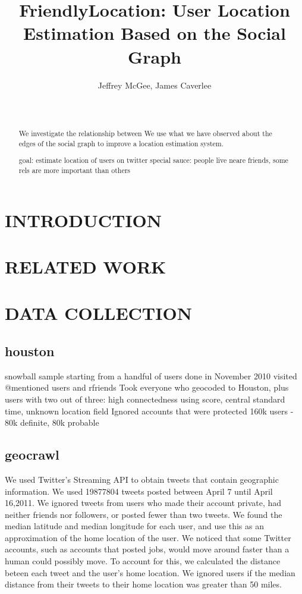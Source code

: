 \documentclass{sig-alternate}
\title{FriendlyLocation: User Location Estimation Based on the Social Graph}
\author{
    \alignauthor Jeffrey McGee, James Caverlee\\
    \affaddr{Department of Computer Science and Engineering, Texas A\&M
    University} \\
    \affaddr{ College Station, TX 77845 USA} \\
    \email{jeffamcgee@tamu.edu, caverlee@cse.tamu.edu}
}
\begin{document}
\maketitle
\begin{abstract}
We investigate the relationship between 
We use what we have observed about the edges of the social graph to improve a location estimation system.

goal: estimate location of users on twitter
special sauce: people live neare friends, some rels are more important than others
\end{abstract}




\section{INTRODUCTION}
\section{RELATED WORK}
\section{DATA COLLECTION}

\subsection{houston}
snowball sample starting from a handful of users done in November 2010
visited @mentioned users and rfriends
Took everyone who geocoded to Houston, plus users with two out of three:
    high connectedness using score,
    central standard time,
    unknown location field
Ignored accounts that were protected
160k users - 80k definite, 80k probable


\subsection{geocrawl}
We used Twitter's Streaming API to obtain tweets that contain geographic information.
We used 19877804 tweets posted between April 7 until April 16,2011.
We ignored tweets from users who made their account private, had neither friends nor followers, or posted fewer than two tweets.
We found the median latitude and median longitude for each user, and use this as an approximation of the home location of the user.
We noticed that some Twitter accounts, such as accounts that posted jobs, would move around faster than a human could possibly move. To account for this, we calculated the distance beteen each tweet and the user's home location. We ignored users if the median distance from their tweets to their home location was greater than 50 miles.
\end{document}
